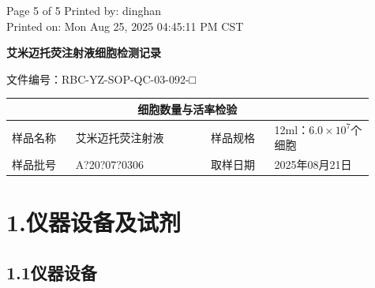 \documentclass[UTF8,10pt,a4paper,fontset=fandol]{ctexart}
\newcommand{\fieldvalue}[1]{#1}
\newcommand{\handwritten}[1]{#1}
\begin{document}
\begin{center}
\scriptsize
Page 5 of 5 \hfill Printed by: dinghan\\
Printed on: Mon Aug 25, 2025 04:45:11 PM CST
\end{center}

\newpage

\begin{center}
\textbf{艾米迈托荧注射液细胞检测记录}
\end{center}

\noindent
文件编号：RBC-YZ-SOP-QC-03-092-□

\begin{center}
\begin{tabular}{|p{0.16\linewidth}|p{0.34\linewidth}|p{0.16\linewidth}|p{0.25\linewidth}|}
\hline
\multicolumn{4}{|c|}{\textbf{细胞数量与活率检验}}\\
\hline
样品名称 &
\fieldvalue{艾米迈托荧注射液} &
样品规格 &
\fieldvalue{12ml：$6.0\times10^{7}$个细胞}\\
\hline
样品批号 &
\fieldvalue{\handwritten{A?20?07?0306}} &
取样日期 &
\fieldvalue{\handwritten{2025年08月21日}}\\
\hline
\end{tabular}
\end{center}

\section*{1.\quad 仪器设备及试剂}

\subsection*{1.1\quad 仪器设备}
\end{document}
